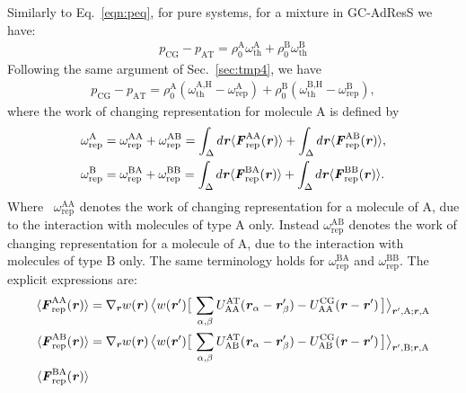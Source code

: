 \documentclass[a4paper,preprint,unsortedaddress]{revtex4-1}
\newcommand{\vect}[1]{\textbf{\textit{#1}}}
\newcommand{\AT}{{\textrm{{AT}}}}
\newcommand{\CG}{{\textrm{CG}}}
\newcommand{\HY}{{\Delta}}
\newcommand{\thf}{{\textrm{th}}}
\newcommand{\res}{{\textrm{rep}}}
\newcommand{\hadress}{{\textrm{H}}}
\newcommand{\typea}{{\textrm{A}}}
\newcommand{\typeb}{{\textrm{B}}}
\begin{document}
{Similarly to Eq.~\eqref{eqn:peq}, for pure systems, for a mixture in GC-AdResS we have:
\begin{align}\label{eqn:peq-d-ab}
  p_\CG - p_\AT=\rho_0^\typea \omega^\typea_\thf + \rho_0^\typeb \omega^\typeb_\thf
\end{align}
Following the same argument of Sec.~\ref{sec:tmp4}, we have
\begin{align}\label{eqn:peq-h-ab}
  p_\CG - p_\AT=
  \rho_0^\typea (\omega^{\typea,\hadress}_\thf - \omega^\typea_\res)
  +
  \rho_0^\typeb (\omega^{\typeb,\hadress}_\thf - \omega^\typeb_\res),
\end{align}
where the work of changing representation for molecule $\typea$ is defined by
\begin{align}\label{eqn:wrep-split-a}
  \omega^\typea_\res 
  &=
  \omega^{\typea\typea}_\res +\omega^{\typea\typeb}_\res
  = \int_\HY d\vect r \langle \vect F^{\typea\typea}_\res(\vect r)\rangle
  + \int_\HY d\vect r \langle \vect F^{\typea\typeb}_\res(\vect r)\rangle,\\
  \label{eqn:wrep-split-b}
  \omega^\typeb_\res 
  &=
  \omega^{\typeb\typea}_\res +\omega^{\typeb\typeb}_\res
  = \int_\HY d\vect r \langle \vect F^{\typeb\typea}_\res(\vect r)\rangle
  + \int_\HY d\vect r \langle \vect F^{\typeb\typeb}_\res(\vect r)\rangle.
\end{align}
Where ~$\omega_\res^{\typea\typea}$ denotes the work of changing representation for a molecule of $\typea$, due to the interaction with molecules of type $\typea$ only. Instead $\omega_\res^{\typea\typeb}$ denotes the work of changing representation for a molecule of $\typea$, due to the interaction with molecules of type $\typeb$ only. The same terminology holds for $\omega_\res^{\typeb\typea}$ and $\omega_\res^{\typeb\typeb}$.
The explicit expressions are:
\begin{align}
  \langle \vect F^{\typea\typea}_\res(\vect r)\rangle
  &=
  \nabla_{\vect r} w(\vect r)\,
  \big\langle w(\vect r')
  \big[\, \sum_{\alpha,\beta} U^\AT_{\typea\typea}(\vect r_\alpha- \vect r'_\beta)
  - U^\CG_{\typea\typea}(\vect r- \vect r') \,\big]
  \big\rangle_{\vect r',\typea; \vect r,\typea}\\
  \langle \vect F^{\typea\typeb}_\res(\vect r)\rangle
  &=
  \nabla_{\vect r} w(\vect r)\,
  \big\langle w(\vect r')
  \big[\, \sum_{\alpha,\beta} U^\AT_{\typea\typeb}(\vect r_\alpha- \vect r'_\beta)
  - U^\CG_{\typea\typeb}(\vect r- \vect r') \,\big]
  \big\rangle_{\vect r',\typeb; \vect r,\typea}\\
  \langle \vect F^{\typeb\typea}_\res(\vect r)\rangle

\end{align}}
\end{document}
